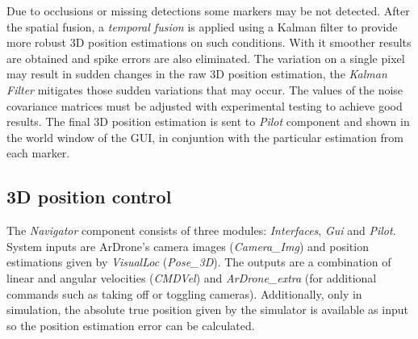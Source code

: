 \documentclass{styles/svproc}
\begin{document}
	
	


	
        Due to occlusions or missing detections some markers may be not detected. After the spatial fusion, a \textit{temporal fusion} is applied using a Kalman filter to provide more robust 3D position estimations on such conditions. With it smoother results are obtained and spike errors are also eliminated. The variation on a single pixel may result in sudden changes in the raw 3D position estimation, the \textit{Kalman Filter} mitigates those sudden variations that may occur. The values of the noise covariance matrices must be adjusted with experimental testing to achieve good results. The final 3D position estimation is sent to \textit{Pilot} component and shown in the world window of the GUI, in conjuntion with the particular estimation from each marker.
	
\subsection{3D position control}


The \textit{Navigator} component consists of three modules: \textit{Interfaces}, \textit{Gui} and \textit{Pilot}. System inputs are ArDrone's camera images (\textit{Camera\_Img}) and position estimations given by \textit{VisualLoc} (\textit{Pose\_3D}). The outputs are a combination of linear and angular velocities (\textit{CMDVel}) and \textit{ArDrone\_extra} (for additional commands such as taking off or toggling cameras). Additionally, only in simulation, the absolute true position given by the simulator is available as input so the position estimation error can be calculated. 
	
\end{document}
